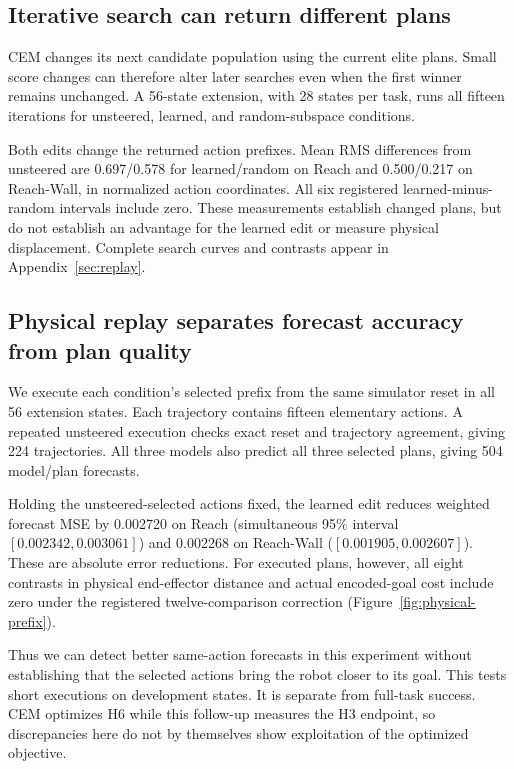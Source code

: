 \documentclass{article}
\begin{document}
\subsection{Iterative search can return different plans}

CEM changes its next candidate population using the current elite plans. Small score changes can therefore alter later searches even when the first winner remains unchanged. A 56-state extension, with 28 states per task, runs all fifteen iterations for unsteered, learned, and random-subspace conditions.

Both edits change the returned action prefixes. Mean RMS differences from unsteered are 0.697/0.578 for learned/random on Reach and 0.500/0.217 on Reach-Wall, in normalized action coordinates. All six registered learned-minus-random intervals include zero. These measurements establish changed plans, but do not establish an advantage for the learned edit or measure physical displacement. Complete search curves and contrasts appear in Appendix~\ref{sec:replay}.

\subsection{Physical replay separates forecast accuracy from plan quality}

We execute each condition's selected prefix from the same simulator reset in all 56 extension states. Each trajectory contains fifteen elementary actions. A repeated unsteered execution checks exact reset and trajectory agreement, giving 224 trajectories. All three models also predict all three selected plans, giving 504 model/plan forecasts.

Holding the unsteered-selected actions fixed, the learned edit reduces weighted forecast MSE by 0.002720 on Reach (simultaneous 95\% interval $[0.002342,0.003061]$) and 0.002268 on Reach-Wall ($[0.001905,0.002607]$). These are absolute error reductions. For executed plans, however, all eight contrasts in physical end-effector distance and actual encoded-goal cost include zero under the registered twelve-comparison correction (Figure~\ref{fig:physical-prefix}).

Thus we can detect better same-action forecasts in this experiment without establishing that the selected actions bring the robot closer to its goal. This tests short executions on development states. It is separate from full-task success. CEM optimizes H6 while this follow-up measures the H3 endpoint, so discrepancies here do not by themselves show exploitation of the optimized objective.
\end{document}
